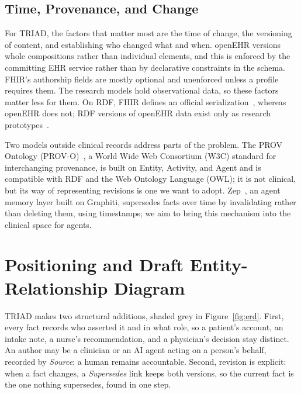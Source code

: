 \documentclass[sigconf]{acmart}
\begin{document}
\subsection{Time, Provenance, and Change}
For TRIAD, the factors that matter most are the time of change, the versioning
of content, and establishing who changed what and when. openEHR versions whole
compositions rather than individual elements, and this is enforced by the
committing EHR service rather than by declarative constraints in the schema.
FHIR's authorship fields are mostly optional and unenforced unless a profile
requires them. The research models hold observational data, so these factors
matter less for them. On RDF, FHIR defines an official
serialization~\cite{fhir-r4}, whereas openEHR does not; RDF versions of
openEHR data exist only as research prototypes~\cite{haarbrandt2016}.

Two models outside clinical records address parts of the problem.
The PROV Ontology (PROV-O)~\cite{provo2013}, a World Wide Web Consortium (W3C)
standard for interchanging provenance, is built on Entity, Activity, and Agent
and is compatible with RDF and the Web Ontology Language (OWL); it is not
clinical, but its way of representing revisions is one we want to adopt.
Zep~\cite{zep2025}, an agent memory layer built on Graphiti, supersedes facts
over time by invalidating rather than deleting them, using timestamps; we aim
to bring this mechanism into the clinical space for agents.

\section{Positioning and Draft Entity-Relationship Diagram}
TRIAD makes two structural additions, shaded grey in Figure~\ref{fig:erd}. First, every fact records who asserted it and in what role, so a patient's account, an intake note, a nurse's recommendation, and a physician's decision stay distinct. An author may be a clinician or an AI agent acting on a person's behalf, recorded by \textit{Source}; a human remains accountable. Second, revision is explicit: when a fact changes, a \textit{Supersedes} link keeps both versions, so the current fact is the one nothing supersedes, found in one step.
\end{document}
